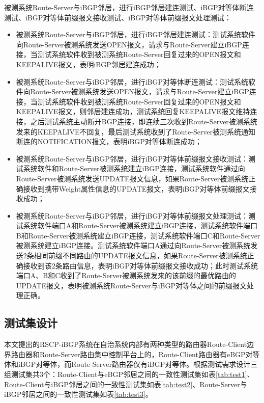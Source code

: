 被测系统Route-Server与iBGP邻居，进行iBGP邻居建连测试、iBGP对等体断连测试、iBGP对等体前缀报文接收测试、iBGP对等体前缀报文处理测试：
\begin{itemize}
  \item 被测系统Route-Server与iBGP邻居，进行iBGP邻居建连测试：测试系统软件向Route-Server被测系统发送OPEN报文，请求与Route-Server建立iBGP连接，当测试系统软件收到被测系统Route-Server回复过来的OPEN报文和KEEPALIVE报文，表明iBGP邻居建连成功；
  \item 被测系统Route-Server与iBGP邻居，进行iBGP对等体断连测试：测试系统软件向Route-Server被测系统发送OPEN报文，请求与Route-Server建立iBGP连接，当测试系统软件收到被测系统Route-Server回复过来的OPEN报文和KEEPALIVE报文，则邻居建连成功，测试系统回复KEEPALIVE报文维持连接，之后测试系统主动断开BGP连接，即连续三次收到Route-Server被测系统发来的KEEPALIVE不回复，最后测试系统收到了Route-Server被测系统通知断连的NOTIFICATION报文，表明iBGP对等体断连成功；
  \item 被测系统Route-Server与iBGP邻居，进行iBGP对等体前缀报文接收测试：测试系统软件和Route-Server被测系统建立iBGP连接，测试系统软件通过向Route-Server被测系统发送UPDATE报文信息，如果Route-Server被测系统正确接收到携带Weight属性信息的UPDATE报文，表明iBGP对等体前缀报文接收成功；
  \item 被测系统Route-Server与iBGP邻居，进行iBGP对等体前缀报文处理测试：测试系统软件端口A和Route-Server被测系统建立iBGP连接，测试系统软件端口B和Route-Server被测系统建立iBGP连接，测试系统软件端口C和Route-Server被测系统建立iBGP连接。测试系统软件端口A通过向Route-Server被测系统发送2条相同前缀不同路由的UPDATE报文信息，如果Route-Server被测系统正确接收到该2条路由信息，表明iBGP对等体前缀报文接收成功；此时测试系统端口A、B和C收到了Route-Server被测系统发来的该前缀的最优路由的UPDATE报文，表明被测系统Route-Server与iBGP对等体之间的前缀报文处理正确。
\end{itemize}



\subsection{测试集设计}

本文提出的RSCP-iBGP系统在自治系统内部有两种类型的路由器Route-Client边界路由器和Route-Server路由集中控制平台上的，Route-Client路由器有eBGP对等体和iBGP对等体，而Route-Server路由器仅有iBGP对等体。根据测试需求设计三组测试集共3个：Route-Client与eBGP邻居之间的一致性测试集如表\ref{tab:test1}、Route-Client与iBGP邻居之间的一致性测试集如表\ref{tab:test2}、Route-Server与iBGP邻居之间的一致性测试集如表\ref{tab:test3}。


